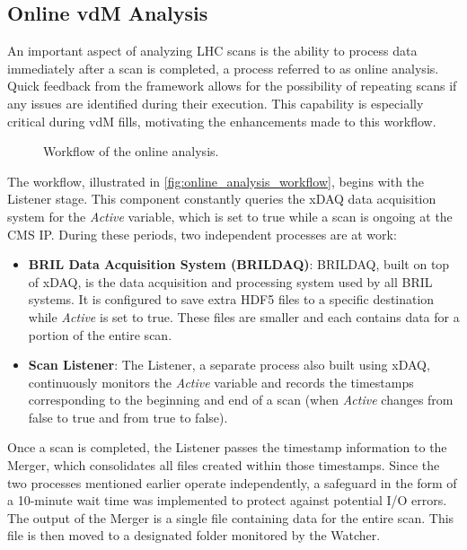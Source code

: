 \subsection{Online vdM Analysis}

An important aspect of analyzing LHC scans is the ability to process data immediately after a scan is completed, a process referred to as online analysis. Quick feedback from the framework allows for the possibility of repeating scans if any issues are identified during their execution. This capability is especially critical during vdM fills, motivating the enhancements made to this workflow.

\begin{figure}[!htb]
	\centering
	\caption{Workflow of the online analysis.}
	\label{fig:online_analysis_workflow}
\end{figure}

The workflow, illustrated in \autoref{fig:online_analysis_workflow}, begins with the Listener stage. This component constantly queries the xDAQ data acquisition system \cite{Brigljevic:845273} for the \textit{Active} variable, which is set to true while a scan is ongoing at the CMS IP. During these periods, two independent processes are at work:

\begin{itemize}
	\item \textbf{BRIL Data Acquisition System (BRILDAQ)}: BRILDAQ, built on top of xDAQ, is the data acquisition and processing system used by all BRIL systems. It is configured to save extra HDF5 files to a specific destination while \textit{Active} is set to true. These files are smaller and each contains data for a portion of the entire scan.
	\item \textbf{Scan Listener}: The Listener, a separate process also built using xDAQ, continuously monitors the \textit{Active} variable and records the timestamps corresponding to the beginning and end of a scan (when \textit{Active} changes from false to true and from true to false).
\end{itemize}

Once a scan is completed, the Listener passes the timestamp information to the Merger, which consolidates all files created within those timestamps. Since the two processes mentioned earlier operate independently, a safeguard in the form of a 10-minute wait time was implemented to protect against potential I/O errors. The output of the Merger is a single file containing data for the entire scan. This file is then moved to a designated folder monitored by the Watcher.

